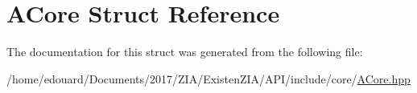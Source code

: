 \hypertarget{structACore}{}\section{A\+Core Struct Reference}
\label{structACore}


The documentation for this struct was generated from the following file\+:\begin{DoxyCompactItemize}
\item 
/home/edouard/\+Documents/2017/\+Z\+I\+A/\+Existen\+Z\+I\+A/\+A\+P\+I/include/core/\mbox{\hyperlink{ACore_8hpp}{A\+Core.\+hpp}}\end{DoxyCompactItemize}
